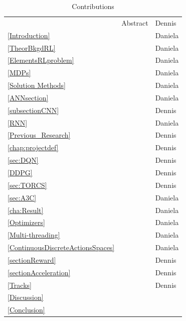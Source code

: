 \begin{table}[H]
	\caption{Contributions}
	\begin{tabular}{lll}
		& Abstract & Dennis \\
		\ref{Introduction} & \nameref{Introduction} & Daniela \\
		\ref{TheorBkgdRL} & \nameref{TheorBkgdRL} & Daniela \\
		\ref{ElementsRLproblem} & \nameref{ElementsRLproblem} & Daniela \\
		\ref{MDPs} & \nameref{MDPs} & Daniela \\
		\ref{Solution Methods} & \nameref{Solution Methods} & Daniela \\
		\ref{ANNsection} & \nameref{ANNsection} & Daniela \\
		\ref{subsectionCNN} & \nameref{subsectionCNN} & Dennis \\
		\ref{RNN} & \nameref{RNN} & Daniela \\
		\ref{Previous_Research} & \nameref{Previous_Research} & Dennis \\
		\ref{chap:projectdef} & \nameref{chap:projectdef} & Dennis \\
		\ref{sec:DQN} & \nameref{sec:DQN} & Dennis \\
		\ref{DDPG} & \nameref{DDPG} & Dennis \\
		\ref{sec:TORCS} & \nameref{sec:TORCS} & Dennis \\
		\ref{sec:A3C} & \nameref{sec:A3C} & Daniela \\
		\ref{cha:Result} & \nameref{cha:Result} & Daniela \\
		\ref{Optimizers} & \nameref{Optimizers} & Daniela \\
		\ref{Multi-threading} & \nameref{Multi-threading} & Daniela \\
		\ref{ContinuousDiscreteActionsSpaces} & \nameref{ContinuousDiscreteActionsSpaces} & Daniela \\
		\ref{sectionReward} & \nameref{sectionReward} & Dennis \\
		\ref{sectionAcceleration} & \nameref{sectionAcceleration} & Dennis \\
		\ref{Tracks} & \nameref{Tracks} & Dennis \\
		\ref{Discussion} & \nameref{Discussion} &  \\
		\ref{Conclusion} & \nameref{Conclusion} &  
	\end{tabular}
\end{table}